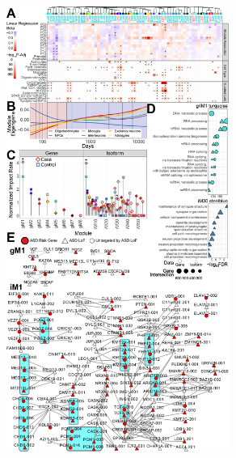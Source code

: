 \documentclass[12pt,chapterheads,final]{ucsd}
\begin{document}
\begin{figure}[h]
  \centering
  \includegraphics[width=0.65\textwidth]{figure3}
\end{figure}
\end{document}
